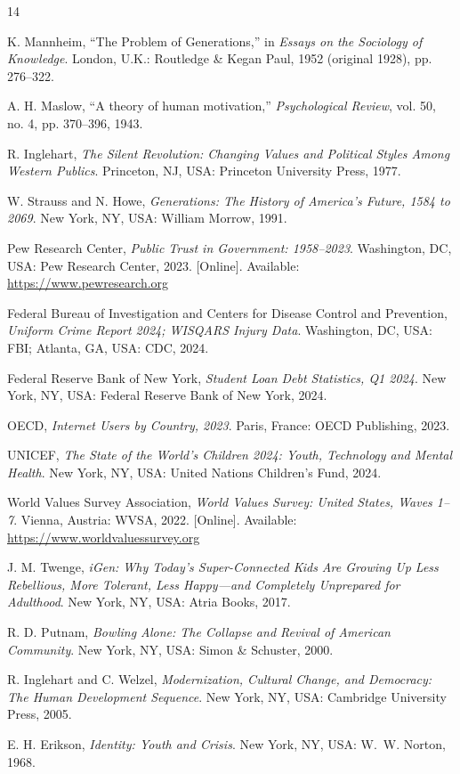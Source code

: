 \documentclass[conference]{IEEEtran}
\begin{document}
\begin{thebibliography}{14}

K. Mannheim, ``The Problem of Generations,'' in \textit{Essays on the Sociology of Knowledge}. London, U.K.: Routledge \& Kegan Paul, 1952 (original 1928), pp. 276--322.

A. H. Maslow, ``A theory of human motivation,'' \textit{Psychological Review}, vol. 50, no. 4, pp. 370--396, 1943.

R. Inglehart, \textit{The Silent Revolution: Changing Values and Political Styles Among Western Publics}. Princeton, NJ, USA: Princeton University Press, 1977.

W. Strauss and N. Howe, \textit{Generations: The History of America's Future, 1584 to 2069}. New York, NY, USA: William Morrow, 1991.

Pew Research Center, \textit{Public Trust in Government: 1958--2023}. Washington, DC, USA: Pew Research Center, 2023. [Online]. Available: \url{https://www.pewresearch.org}

Federal Bureau of Investigation and Centers for Disease Control and Prevention, \textit{Uniform Crime Report 2024; WISQARS Injury Data}. Washington, DC, USA: FBI; Atlanta, GA, USA: CDC, 2024.

Federal Reserve Bank of New York, \textit{Student Loan Debt Statistics, Q1 2024}. New York, NY, USA: Federal Reserve Bank of New York, 2024.

OECD, \textit{Internet Users by Country, 2023}. Paris, France: OECD Publishing, 2023.

UNICEF, \textit{The State of the World's Children 2024: Youth, Technology and Mental Health}. New York, NY, USA: United Nations Children's Fund, 2024.

World Values Survey Association, \textit{World Values Survey: United States, Waves 1--7}. Vienna, Austria: WVSA, 2022. [Online]. Available: \url{https://www.worldvaluessurvey.org}

J. M. Twenge, \textit{iGen: Why Today's Super-Connected Kids Are Growing Up Less Rebellious, More Tolerant, Less Happy---and Completely Unprepared for Adulthood}. New York, NY, USA: Atria Books, 2017.

R. D. Putnam, \textit{Bowling Alone: The Collapse and Revival of American Community}. New York, NY, USA: Simon \& Schuster, 2000.

R. Inglehart and C. Welzel, \textit{Modernization, Cultural Change, and Democracy: The Human Development Sequence}. New York, NY, USA: Cambridge University Press, 2005.

E. H. Erikson, \textit{Identity: Youth and Crisis}. New York, NY, USA: W.~W. Norton, 1968.

\end{thebibliography}
\end{document}
